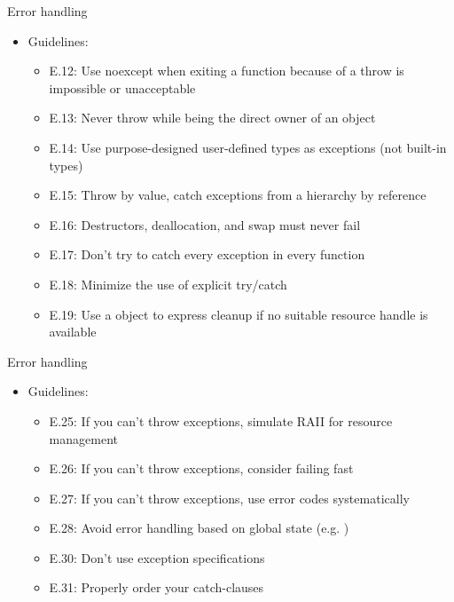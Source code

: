 \begin{frame}[t]{Error handling}
\begin{itemize}
  \item Guidelines:
  \begin{itemize}
      \item E.12: Use noexcept when exiting a function because of a throw is impossible or unacceptable
      \item E.13: Never throw while being the direct owner of an object
      \item E.14: Use purpose-designed user-defined types as exceptions (not built-in types)
      \item E.15: Throw by value, catch exceptions from a hierarchy by reference
      \item E.16: Destructors, deallocation, and swap must never fail
      \item E.17: Don’t try to catch every exception in every function
      \item E.18: Minimize the use of explicit try/catch
      \item E.19: Use a  object to express cleanup if no suitable resource handle is available
  \end{itemize}
\end{itemize}
\end{frame}

\begin{frame}[t]{Error handling}
\begin{itemize}
  \item Guidelines:
  \begin{itemize}
      \item E.25: If you can’t throw exceptions, simulate RAII for resource management
      \item E.26: If you can’t throw exceptions, consider failing fast
      \item E.27: If you can’t throw exceptions, use error codes systematically
      \item E.28: Avoid error handling based on global state (e.g. )
      \item E.30: Don’t use exception specifications
      \item E.31: Properly order your catch-clauses
  \end{itemize}
\end{itemize}
\end{frame}
